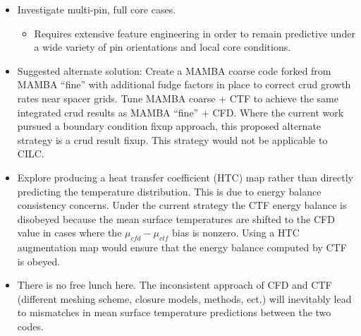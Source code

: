 \begin{itemize}
	\item  Investigate multi-pin, full core cases.
	\begin{itemize}
		\item Requires extensive feature engineering in order to remain predictive under a wide variety of pin orientations and local core conditions.
	\end{itemize}
	\item Suggested alternate solution:  Create a MAMBA coarse code forked from MAMBA ``fine'' with additional fudge factors in place to correct crud growth rates near spacer grids.  Tune MAMBA coarse + CTF to achieve the same integrated crud results as MAMBA ``fine'' + CFD.  Where the current work pursued a boundary condition fixup approach, this proposed alternate strategy is a crud result fixup.   This strategy would not be applicable to CILC.
        \item Explore producing a heat transfer coefficient (HTC) map rather than directly predicting the temperature distribution.  This is due to energy balance consistency concerns.  Under the current strategy the CTF energy balance is disobeyed because the mean surface temperatures are shifted to the CFD value in cases where the $\mu_{cfd}-\mu_{ctf}$ bias is nonzero.  Using a HTC augmentation map would ensure that the energy balance computed by CTF is obeyed.
	\item There is no free lunch here.  The inconsistent approach of CFD and CTF (different meshing scheme, closure models, methods, ect.) will inevitably lead to mismatches in mean surface temperature predictions between the two codes.
\end{itemize}
